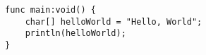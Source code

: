 \begin{verbatim}
func main:void() {
    char[] helloWorld = "Hello, World";
    println(helloWorld);
}
\end{verbatim}